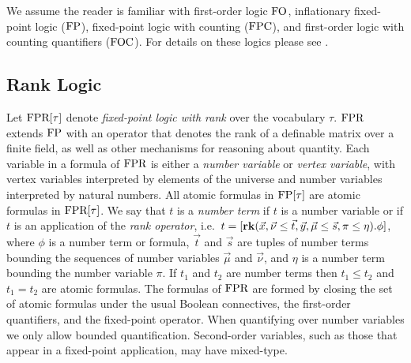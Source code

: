 \documentclass[a4paper,UKenglish]{lipics-v2018}
\begin{document}

We assume the reader is familiar with first-order logic $\text{\upshape FO}$, inflationary
fixed-point logic ($\text{\upshape FP}$), fixed-point logic with counting ($\text{\upshape FPC}$), and
first-order logic with counting quantifiers ($\text{\upshape FOC}$). For details on these
logics please see \cite{grohe2017descriptive, immerman1999descriptive}.

\subsection{Rank Logic}
Let $\text{\upshape FPR}[\tau]$ denote \emph{fixed-point logic with rank} over the
vocabulary $\tau$. $\text{\upshape FPR}$ extends $\text{\upshape FP}$ with an operator that denotes the rank
of a definable matrix over a finite field, as well as other mechanisms for
reasoning about quantity. Each variable in a formula of $\text{\upshape FPR}$ is either a
\emph{number variable} or \emph{vertex variable}, with vertex
variables interpreted by elements of the universe and number variables
interpreted by natural numbers.
All atomic formulas in $\text{\upshape FP}[\tau]$ are atomic formulas in $\text{\upshape FPR}[\tau]$. We say
that $t$ is a \emph{number term} if $t$ is a number variable or if $t$ is an
application of the \emph{rank operator}, i.e.\ $t = [\text{\textbf{rk}} (\vec{x}, \vec {\nu}
\leq \vec{t}, \vec{y},\vec{\mu} \leq \vec{s}, \pi \leq \eta). \phi]$, where
$\phi$ is a number term or formula, $\vec{t}$ and $\vec{s}$ are tuples of number
terms bounding the sequences of number variables $\vec{\mu}$ and $\vec{\nu}$,
and $\eta$ is a number term bounding the number variable $\pi$. If $t_1$ and
$t_2$ are number terms then $t_1 \leq t_2$ and $t_1 = t_2$ are atomic formulas.
The formulas of $\text{\upshape FPR}$ are formed by closing the set of atomic formulas under
the usual Boolean connectives, the first-order quantifiers, and the fixed-point
operator. When quantifying over number variables we only allow bounded
quantification. Second-order variables, such as those that appear in a
fixed-point application, may have mixed-type.
\end{document}
